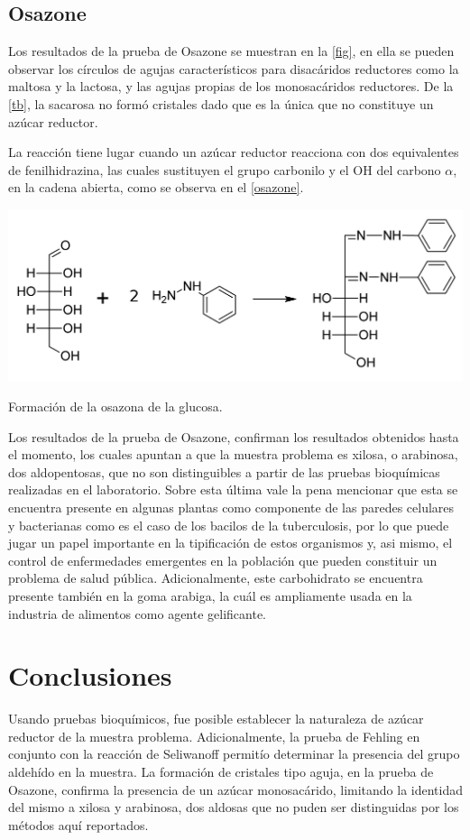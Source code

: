 \documentclass[fleqn,10pt]{SelfArx}
\begin{document}
	\subsection{Osazone}
		Los resultados de la prueba de Osazone se muestran en la \autoref{fig}, en ella se pueden observar los c\'irculos de agujas caracter\'isticos para disac\'aridos reductores como la maltosa y la lactosa, y las agujas propias de los monosac\'aridos reductores. De la \autoref{tb}, la sacarosa no form\'o cristales dado que es la \'unica que no constituye un azúcar reductor.
		
		La reacci\'on tiene lugar cuando un az\'ucar reductor reacciona con dos equivalentes de fenilhidrazina, las cuales sustituyen el grupo carbonilo y el OH del carbono $\alpha$, en la cadena abierta, como se observa en el \autoref{osazone}.
		\begin{scheme}[h]
			\centering
			\includegraphics[width=\linewidth]{osazone}
			\caption{Formaci\'on de la osazona de la glucosa.}
			\label{osazone}
		\end{scheme}
	
		Los resultados de la prueba de Osazone, confirman los resultados obtenidos hasta el momento, los cuales apuntan a que la muestra problema es xilosa, o arabinosa, dos aldopentosas, que no son distinguibles a partir de las pruebas bioqu\'imicas realizadas en el laboratorio. Sobre esta \'ultima vale la pena mencionar que esta se encuentra presente en algunas plantas como componente de las paredes celulares y bacterianas como es el caso de los bacilos de la tuberculosis, por lo que puede jugar un papel importante en la tipificación de estos organismos y, asi mismo, el control de enfermedades emergentes en la población que pueden constituir un problema de salud pública. Adicionalmente, este carbohidrato se encuentra presente también en la goma arabiga, la cuál es ampliamente usada en la industria de alimentos como agente gelificante.
		
	
\section{Conclusiones}
	Usando pruebas bioqu\'imicos, fue posible establecer la naturaleza de az\'ucar reductor de la muestra problema. Adicionalmente, la prueba de Fehling en conjunto con la reacci\'on de Seliwanoff permit\'io determinar la presencia del grupo aldeh\'ido en la muestra. La formaci\'on de cristales tipo aguja, en la prueba de Osazone, confirma la presencia de un az\'ucar monosac\'arido, limitando la identidad del mismo a xilosa y arabinosa, dos aldosas que no puden ser distinguidas por los m\'etodos aqu\'i reportados.
	
\end{document}
